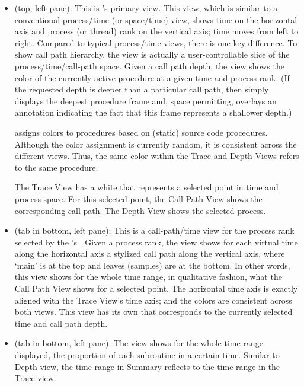 \begin{itemize}
\item \textbf{\traceview} (top, left pane):
  This is \hpctraceviewer{}'s primary view.
  This view, which is similar to a conventional process/time (or space/time) view, shows time on the horizontal axis and process (or thread) rank on the vertical axis; time moves from left to right.
  Compared to typical process/time views, there is one key difference.
  To show call path hierarchy, the view is actually a user-controllable slice of the process/time/call-path space.
  Given a call path depth, the view shows the color of the currently active procedure at a given time and process rank.
  (If the requested depth is deeper than a particular call path, then \hpctraceviewer{} simply displays the deepest procedure frame and, space permitting, overlays an annotation indicating the fact that this frame represents a shallower depth.)

  \hpctraceviewer{} assigns colors to procedures based on (static) source code procedures.
  Although the color assignment is currently random, it is consistent across the different views.
  Thus, the same color within the Trace and Depth Views refers to the same procedure.

  The Trace View has a white \crosshair{} that represents a selected point in time and process space.
  For this selected point, the Call Path View shows the corresponding call path.
  The Depth View shows the selected process.

\item \textbf{\depthview} (tab in bottom, left pane):
  This is a call-path/time view for the process rank selected by the \traceview's \crosshair{}.
  Given a process rank, the view shows for each virtual time along the horizontal axis a stylized call path along the vertical axis, where `main' is at the top and leaves (samples) are at the bottom.
  In other words, this view shows for the whole time range, in qualitative fashion, what the Call Path View shows for a selected point.
  The horizontal time axis is exactly aligned with the Trace View's time axis; and the colors are consistent across both views.
  This view has its own \crosshair{} that corresponds to the currently selected time and call path depth.

\item \textbf{\summaryview} (tab in bottom, left pane):
  The view shows for the whole time range displayed, the proportion of each subroutine in a certain time.
  Similar to Depth view, the time range in Summary reflects to the time range in the Trace view.


\end{itemize}
